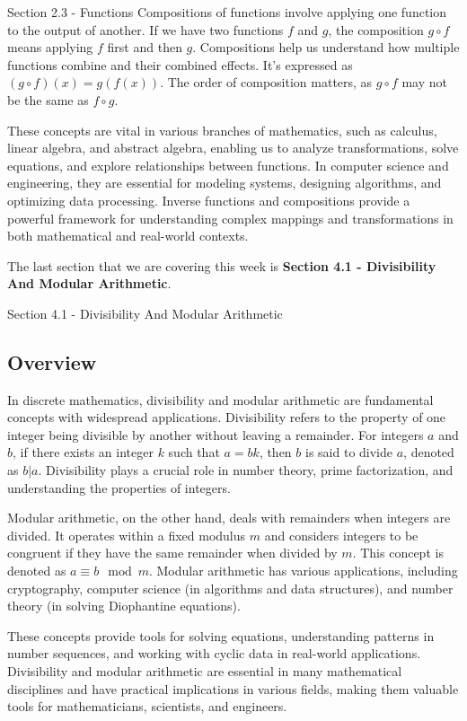 \begin{notes}{Section 2.3 - Functions}
    Compositions of functions involve applying one function to the output of another. If we have two functions $f$ and $g$, the composition $g \circ f$ means applying $f$ first and then $g$. Compositions help 
    us understand how multiple functions combine and their combined effects. It's expressed as $(g \circ f)(x) = g(f(x))$. The order of composition matters, as $g \circ f$ may not be the same as $f \circ g$.
    
    These concepts are vital in various branches of mathematics, such as calculus, linear algebra, and abstract algebra, enabling us to analyze transformations, solve equations, and explore relationships between 
    functions. In computer science and engineering, they are essential for modeling systems, designing algorithms, and optimizing data processing. Inverse functions and compositions provide a powerful framework 
    for understanding complex mappings and transformations in both mathematical and real-world contexts.
\end{notes}

The last section that we are covering this week is \textbf{Section 4.1 - Divisibility And Modular Arithmetic}.

\begin{notes}{Section 4.1 - Divisibility And Modular Arithmetic}
    \subsection*{Overview}

    In discrete mathematics, divisibility and modular arithmetic are fundamental concepts with widespread applications. Divisibility refers to the property of one integer being divisible by another without leaving 
    a remainder. For integers $a$ and $b$, if there exists an integer $k$ such that $a = bk$, then $b$ is said to divide $a$, denoted as $b | a$. Divisibility plays a crucial role in number theory, prime 
    factorization, and understanding the properties of integers.

    Modular arithmetic, on the other hand, deals with remainders when integers are divided. It operates within a fixed modulus $m$ and considers integers to be congruent if they have the same remainder when 
    divided by $m$. This concept is denoted as $a \equiv b \mod m$. Modular arithmetic has various applications, including cryptography, computer science (in algorithms and data structures), and number theory 
    (in solving Diophantine equations).
    
    These concepts provide tools for solving equations, understanding patterns in number sequences, and working with cyclic data in real-world applications. Divisibility and modular arithmetic are essential in many 
    mathematical disciplines and have practical implications in various fields, making them valuable tools for mathematicians, scientists, and engineers.
\end{notes}
